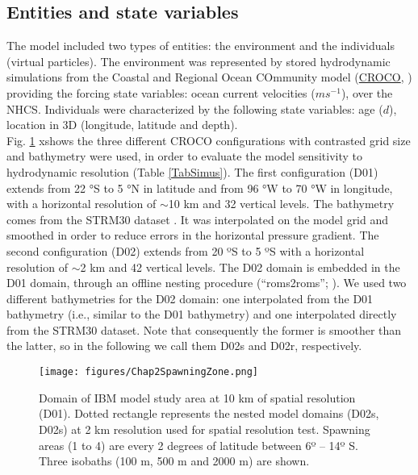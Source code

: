 \subsection{Entities and state variables}\label{Chap2MethEnti}

The model included two types of entities: the environment and the individuals (virtual particles). The environment was represented by stored hydrodynamic simulations from the Coastal and Regional Ocean COmmunity model (\href{https://www.croco-ocean.org/}{CROCO}, \cite{HiltAucl2020,ShchMcwi2005}) providing the forcing state variables: ocean current velocities ($ms^{-1}$), over the NHCS. Individuals were characterized by the following state variables: age ($d$), location in 3D (longitude, latitude and depth).\\

Fig. \ref{Chap2SpawningZone} xshows the three different CROCO configurations with contrasted grid size and bathymetry were used, in order to evaluate the model sensitivity to hydrodynamic resolution (Table \ref{TabSimus}). The first configuration (D01) extends from 22 °S to 5 °N in latitude and from 96 °W to 70 °W in longitude, with a horizontal resolution of $\sim$10 km and 32 vertical levels. The bathymetry comes from the STRM30 dataset \citep{BeckSand2009}. It was interpolated on the model grid and smoothed in order to reduce errors in the horizontal pressure gradient. The second configuration (D02) extends from 20 ºS to 5 ºS with a horizontal resolution of $\sim$2 km and 42 vertical levels. The D02 domain is embedded in the D01 domain, through an offline nesting procedure (``roms2roms''; \cite{MasoMole2010}). We used two different bathymetries for the D02 domain: one interpolated from the D01 bathymetry (i.e., similar to the D01 bathymetry) and one interpolated directly from the STRM30 dataset. Note that consequently the former is smoother than the latter, so in the following we call them D02s and D02r, respectively.\\

\begin{figure}[ht]
	\texttt{[image: figures/Chap2SpawningZone.png]}
	\centering
	\caption{Domain of IBM model study area at 10 km of spatial resolution (D01). Dotted rectangle represents the nested model domains (D02s, D02s) at 2 km resolution used for spatial resolution test. Spawning areas (1 to 4) are every 2 degrees of latitude between 6º – 14º S. Three isobaths (100 m, 500 m and 2000 m) are shown.}
	\label{Chap2SpawningZone}
\end{figure}

